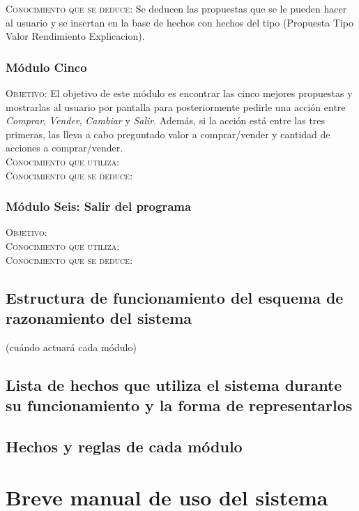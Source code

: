 \documentclass[12pt]{article}
\begin{document}
\textsc{Conocimiento que se deduce}: Se deducen las propuestas que se le pueden hacer al usuario y se insertan en la base de hechos con hechos del tipo (Propuesta Tipo Valor Rendimiento Explicacion).

\subsubsection{Módulo Cinco}
\textsc{Objetivo}: El objetivo de este módulo es encontrar las cinco mejores propuestas y mostrarlas al usuario por pantalla para posteriormente pedirle una acción entre \textit{Comprar}, \textit{Vender}, \textit{Cambiar} y \textit{Salir}. Además, si la acción está entre las tres primeras, las lleva a cabo preguntado valor a comprar/vender y cantidad de acciones a comprar/vender.\\

\textsc{Conocimiento que utiliza}: \\

\textsc{Conocimiento que se deduce}:

\subsubsection{Módulo Seis: Salir del programa}
\textsc{Objetivo}: \\

\textsc{Conocimiento que utiliza}: \\

\textsc{Conocimiento que se deduce}:

\subsection{Estructura de funcionamiento del esquema de razonamiento del sistema}
(cuándo actuará cada módulo)

\subsection{Lista de hechos que utiliza el sistema durante su funcionamiento y la forma de representarlos}

\subsection{Hechos y reglas de cada módulo}

\section{Breve manual de uso del sistema}
\end{document}
